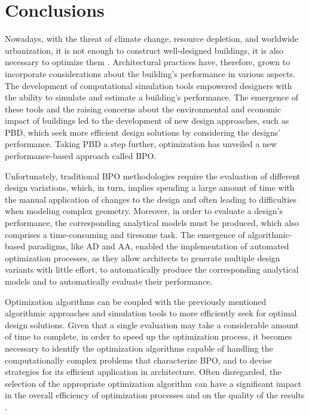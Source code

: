 \section{Conclusions}
\label{sec:concl}

Nowadays, with the threat of climate change, resource depletion, and worldwide urbanization, it is not enough to construct well-designed buildings, it is also necessary to optimize them \cite{Wortmann2015AdvSBO}. Architectural practices have, therefore, grown to incorporate considerations about the building's performance in various aspects. The development of computational simulation tools empowered designers with the ability to simulate and estimate a building’s performance. The emergence of these tools and the raising concerns about the environmental and economic impact of buildings led to the development of new design approaches, such as \ac{PBD}, which seek more efficient design solutions by considering the designs’ performance. Taking \ac{PBD} a step further, optimization has unveiled a new performance-based approach called \ac{BPO}. 

Unfortunately, traditional \ac{BPO} methodologies require the evaluation of different design variations, which, in turn, implies spending a large amount of time with the manual application of changes to the design and often leading to difficulties when modeling complex geometry. Moreover, in order to evaluate a design's performance, the corresponding analytical models must be produced, which also comprises a time-consuming and tiresome task. The emergence of algorithmic-based paradigms, like \ac{AD} and \ac{AA}, enabled the implementation of automated optimization processes, as they allow architects to generate multiple design variants with little effort, to automatically produce the corresponding analytical models and to automatically evaluate their performance. 

Optimization algorithms can be coupled with the previously mentioned algorithmic approaches and simulation tools to more efficiently seek for optimal design solutions. Given that a single evaluation may take a considerable amount of time to complete, in order to speed up the optimization process, it becomes necessary to identify the optimization algorithms capable of handling the computationally complex problems that characterize \ac{BPO}, and to devise strategies for its efficient application in architecture. Often disregarded, the selection of the appropriate optimization algorithm can have a significant impact in the overall efficiency of optimization processes and on the quality of the results \cite{Wolpert1997NFLT}.

